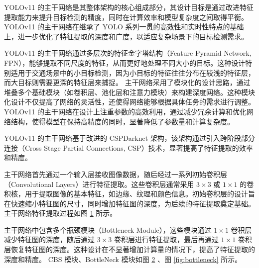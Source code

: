 YOLOv11 的主干网络是其整体架构的核心组成部分，其设计目标是通过改进特征提取能力来提升目标检测的精度，同时在计算效率和模型复杂度之间取得平衡。YOLOv11 的主干网络在继承了 YOLO 系列一贯的高效性和实时性特点的基础上，进一步优化了特征提取的深度和广度，以适应复杂场景下的目标检测需求。

YOLOv11 的主干网络通过多层次的特征金字塔结构（Feature Pyramid Network, FPN），能够提取不同尺度的特征，从而更好地处理不同大小的目标。这种设计特别适用于交通场景中的小目标检测，因为小目标的特征往往分布在较浅的特征层，而大目标则需要更深的特征层来捕捉。
主干网络采用了模块化的设计思路，通过堆叠多个基础模块（如卷积层、池化层和注意力模块）来构建深度网络。这种模块化设计不仅提高了网络的灵活性，还使得网络能够根据具体任务的需求进行调整。
YOLOv11 的主干网络在设计上注重参数的高效利用，通过减少冗余计算和优化网络结构，使得模型在保持高精度的同时，显著降低了参数量和计算复杂度。

YOLOv11 的主干网络基于改进的 CSPDarknet 架构，该架构通过引入跨阶段部分连接（Cross Stage Partial Connections, CSP）技术，显著提高了特征提取的效率和精度。

主干网络首先通过一个输入层接收图像数据，随后经过一系列初始卷积层（Convolutional Layers）进行特征提取。这些卷积层通常采用 $3\times3$ 或 $1\times1$ 的卷积核，用于提取图像的基本特征，如边缘、纹理和颜色信息。初始卷积层的设计旨在快速缩小特征图的尺寸，同时增加特征图的深度，为后续的特征提取奠定基础。
主干网络特征提取过程如图 \ref{fig:YOLOv11_BackBone_input} 所示。
\begin{figure}[htb]
    \centering
    \captionsetup{font=footnotesize}
    \label{fig:YOLOv11_BackBone_input}
\end{figure}

主干网络中包含多个瓶颈模块（Bottleneck Module），这些模块通过 $1\times1$ 卷积层减少特征图的深度，随后通过 $3\times3$ 卷积层进行特征提取，最后再通过 $1\times1$ 卷积层恢复特征图的深度。这种设计在不显著增加计算量的情况下，提高了特征提取的深度和精度。
CBS 模块、BottleNeck 模块如图 \ref{fig:cbs} 、图 \ref{fig:bottleneck} 所示。
\begin{figure}[htb]
    \centering
    \captionsetup{font=footnotesize}
    \label{fig:cbs}
\end{figure}

